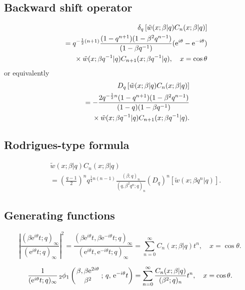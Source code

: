 \documentclass[envcountchap,graybox]{svmono}
\newcommand{\qhyp}[5]{\mbox{}_{#1}{\phi}_{#2}
\left(\genfrac{}{}{0pt}{}{#3}{#4}\,;\,q,\,#5\right)}
\newcommand{\mathindent}{\hspace{7.5mm}}
\newcommand{\e}{\textrm{e}}
\begin{document}
\subsection*{Backward shift operator}
\begin{eqnarray}
\label{shift2ContqUltraI}
& &\delta_q\left[{\tilde w}(x;\beta|q)C_n(x;\beta|q)\right]\nonumber\\
& &{}=q^{-\frac{1}{2}(n+1)}\frac{(1-q^{n+1})(1-\beta^2q^{n-1})}{(1-\beta q^{-1})}
(\e^{i\theta}-\e^{-i\theta})\nonumber\\
& &{}\mathindent{}\times{\tilde w}(x;\beta q^{-1}|q)C_{n+1}(x;\beta q^{-1}|q),\quad x=\cos\theta
\end{eqnarray}
or equivalently
\begin{eqnarray}
\label{shift2ContqUltraII}
& &D_q\left[{\tilde w}(x;\beta|q)C_n(x;\beta|q)\right]\nonumber\\
& &{}=-\frac{2q^{-\frac{1}{2}n}(1-q^{n+1})(1-\beta^2q^{n-1})}{(1-q)(1-\beta q^{-1})}\nonumber\\
& &{}\mathindent{}\times{\tilde w}(x;\beta q^{-1}|q)C_{n+1}(x;\beta q^{-1}|q).
\end{eqnarray}

\subsection*{Rodrigues-type formula}
\begin{eqnarray}
\label{RodContqUltra}
& &{\tilde w}(x;\beta|q)C_n(x;\beta|q)\nonumber\\
& &{}=\left(\frac{q-1}{2}\right)^n
q^{\frac{1}{4}n(n-1)}\frac{(\beta;q)_n}{(q,\beta^2q^n;q)_n}
\left(D_q\right)^n\left[{\tilde w}(x;\beta q^n|q)\right].
\end{eqnarray}

\subsection*{Generating functions}
\begin{equation}
\label{GenContqUltra1}
\left|\frac{(\beta\e^{i\theta}t;q)_{\infty}}{(\e^{i\theta}t;q)_{\infty}}\right|^2
=\frac{(\beta\e^{i\theta}t,\beta\e^{-i\theta}t;q)_{\infty}}
{(\e^{i\theta}t,\e^{-i\theta}t;q)_{\infty}}
=\sum_{n=0}^{\infty}C_n(x;\beta|q)t^n,\quad x=\cos\theta.
\end{equation}

\begin{equation}
\label{GenContqUltra2}
\frac{1}{(\e^{i\theta}t;q)_{\infty}}\,
\qhyp{2}{1}{\beta,\beta\e^{2i\theta}}{\beta^2}{\e^{-i\theta}t}
=\sum_{n=0}^{\infty}\frac{C_n(x;\beta|q)}{(\beta^2;q)_n}t^n,\quad x=\cos\theta.
\end{equation}
\end{document}
